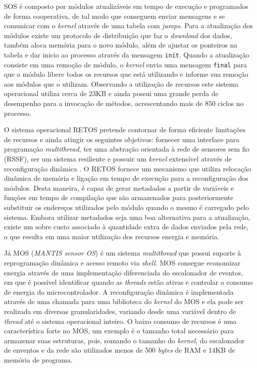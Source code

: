 \documentclass[12pt]{article}
\begin{document}
SOS \cite{han2005dynamic} é composto por módulos atualizáveis em tempo de execução e programados de forma cooperativa, de tal modo que conseguem enviar mensagens e se comunicar com o \textit{kernel} através de uma tabela com \textit{jumps}. Para a atualização dos módulos existe um protocolo de distribuição que faz o \textit{download} dos dados, também aloca memória para o novo módulo, além de ajustar os ponteiros na tabela e dar inicio ao processo através da mensagem \texttt{init}. Quando a atualização consiste em uma remoção de módulo, o \textit{kernel} envia uma mensagem \texttt{final} para que o módulo libere todos os recursos que está utilizando e informe sua remoção aos módulos que o utilizam. Observando a utilização de recursos este sistema operacional utiliza cerca de 23KB e ainda possui uma grande perda de desempenho para a invocação de métodos, acrescentando mais de 850 ciclos no processo.

O sistema operacional RETOS pretende contornar de forma eficiente limitações de recursos e ainda atingir os seguintes objetivos: fornecer uma interface para programação \textit{multithread}, ter uma abstração orientada à rede de sensores sem fio (RSSF), ser um sistema resiliente e possuir um \textit{kernel} extensível através de reconfiguração dinâmica \cite{cha2007retos}. O RETOS fornece um mecanismo que utiliza relocação dinâmica de memória e ligação em tempo de execução para a reconfiguração dos módulos. Desta maneira, é capaz de gerar metadados a partir de variáveis e funções em tempo de compilação que são armazenados para posteriormente substituir os endereços utilizados pelo módulo quando o mesmo é carregado pelo sistema. Embora utilizar metadados seja uma boa alternativa para a atualização, existe um sobre custo associado à quantidade extra de dados enviados pela rede, o que resulta em uma maior utilização dos recursos energia e memória. 

Já MOS (\textit{MANTIS sensor OS}) \cite{bhatti2005mantis} é um sistema \textit{multithread} que possui suporte à reprogramação dinâmica e acesso remoto via \textit{shell}. MOS consegue economizar energia através de uma implementação diferenciada do escalonador de eventos, em que é possível identificar quando as \textit{threads} estão ativas e controlar o consumo de energia do microcontrolador. A reconfiguração dinâmica é implementada através de uma chamada para uma biblioteca do \textit{kernel} do MOS e ela pode ser realizada em diversas granularidades, variando desde uma variável dentro de \textit{thread} até o sistema operacional inteiro. O baixo consumo de recursos é uma característica forte no MOS, um exemplo é o tamanho total necessário para armazenar suas estruturas, pois, somando o tamanho do \textit{kernel}, do escalonador de enventos e da rede são utilizados menos de 500 \textit{bytes} de RAM e 14KB de memória de programa.
\end{document}
